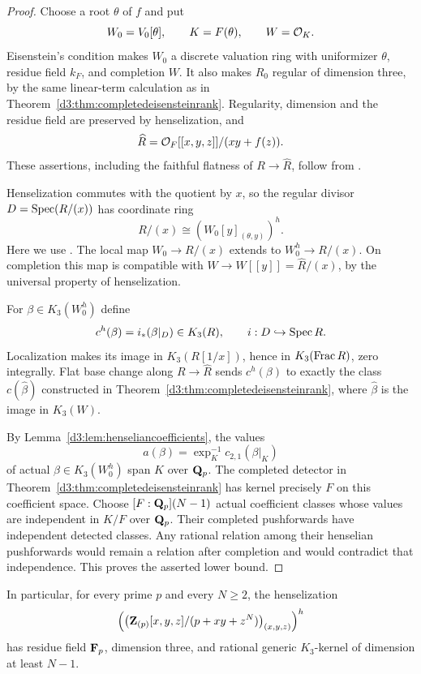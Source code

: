 \begin{proof}
Choose a root $\theta$ of $f$ and put
\[
W_0=V_0[\theta],\qquad K=F(\theta),\qquad W=\mathcal O_K.
\]
Eisenstein's condition makes $W_0$ a discrete valuation ring with
uniformizer $\theta$, residue field $k_F$, and completion $W$.
It also makes $R_0$ regular of dimension three, by the same linear-term
calculation as in Theorem~\ref{d3:thm:completedeisensteinrank}.
Regularity, dimension and the residue field are preserved by
henselization, and
\[
\widehat R=\mathcal O_F[[x,y,z]]/(xy+f(z)).
\]
These assertions, including the faithful flatness of $R\to\widehat R$,
follow from \cite[Section~15.46]{StacksHenselization}.

Henselization commutes with the quotient by $x$, so the regular divisor
$D=\operatorname{Spec}(R/(x))$ has coordinate ring
\[
R/(x)\cong \left(W_0[y]_{(\theta,y)}\right)^h.
\]
Here we use \cite[Section~10.156, Lemma~10.156.2]{StacksHenselization}.
The local map $W_0\to R/(x)$ extends to $W_0^h\to R/(x)$.
On completion this map is compatible with
$W\to W[[y]]=\widehat R/(x)$, by the universal property of
henselization.

For $\beta\in K_3(W_0^h)$ define
\[
c^h(\beta)=i_*(\beta|_D)\in K_3(R),
\qquad i:D\hookrightarrow\operatorname{Spec} R.
\]
Localization makes its image in $K_3(R[1/x])$, hence in
$K_3(\operatorname{Frac} R)$, zero integrally.  Flat base change along
$R\to\widehat R$ sends $c^h(\beta)$ to exactly the class $c(\widehat
\beta)$ constructed in Theorem~\ref{d3:thm:completedeisensteinrank},
where $\widehat\beta$ is the image in $K_3(W)$.

By Lemma~\ref{d3:lem:henseliancoefficients}, the values
\[
a(\beta)=\exp_K^{-1}c_{2,1}(\beta|_K)
\]
of actual $\beta\in K_3(W_0^h)$ span $K$ over $\mathbf Q_p$.
The completed detector in
Theorem~\ref{d3:thm:completedeisensteinrank} has kernel precisely $F$
on this coefficient space.  Choose $[F:\mathbf Q_p](N-1)$ actual coefficient
classes whose values are independent in $K/F$ over $\mathbf Q_p$.
Their completed pushforwards have independent detected classes.
Any rational relation among their henselian pushforwards would remain
a relation after completion and would contradict that independence.
This proves the asserted lower bound.
\end{proof}

In particular, for every prime $p$ and every $N\geq2$, the henselization
\[
\left(\left(\mathbf Z_{(p)}[x,y,z]/(p+xy+z^N)\right)_{(x,y,z)}\right)^h
\]
has residue field $\mathbf F_p$, dimension three, and rational generic
$K_3$-kernel of dimension at least $N-1$.



